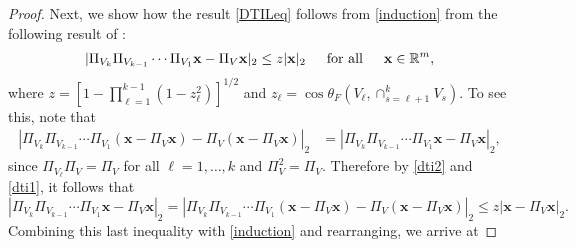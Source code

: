 \documentclass[journal, onecolumn]{IEEEtran}
\begin{document}
\begin{proof}

Next, we show how the result \eqref{DTILeq} follows from \eqref{induction} from the following result of \cite[Theorem 9.33]{Deutsch}:
\begin{align}\label{dti2}
|\Pi_{V_k}\Pi_{V_{k-1}}\cdots\Pi_{V_1} \mathbf{x} - \Pi_V\mathbf{x}|_2 \leq z |\mathbf{x}|_2 \indent \text{for all} \indent \mathbf{x} \in \mathbb{R}^m,
\end{align}
where $z= \left[1 - \prod_{\ell =1}^{k-1}(1-z_{\ell}^2)\right]^{1/2}$ and $z_{\ell} = \cos\theta_F\left(V_{\ell}, \cap_{s=\ell+1}^k V_s\right)$. To see this, note that
\begin{align}\label{dti1}
|\Pi_{V_k}\Pi_{V_{k-1}}\cdots\Pi_{V_1}(\mathbf{x} - \Pi_V\mathbf{x}) - \Pi_V(\mathbf{x} - \Pi_V\mathbf{x})|_2 
&= |\Pi_{V_k}\Pi_{V_{k-1}}\cdots\Pi_{V_1} \mathbf{x} - \Pi_V \mathbf{x} |_2,
\end{align}
since $\Pi_{V_\ell} \Pi_V = \Pi_V$ for all $\ell = 1, \ldots, k$ and $\Pi_V^2 = \Pi_V$.
Therefore by \eqref{dti2} and \eqref{dti1}, it follows that
\[|\Pi_{V_k}\Pi_{V_{k-1}}\cdots\Pi_{V_1} \mathbf{x} - \Pi_V \mathbf{x} |_2
= |\Pi_{V_k}\Pi_{V_{k-1}}\cdots\Pi_{V_1}(\mathbf{x} - \Pi_V\mathbf{x}) - \Pi_V(\mathbf{x} - \Pi_V\mathbf{x})|_2  \leq z |\mathbf{x} - \Pi_V\mathbf{x}|_2.\]
Combining this last inequality with \eqref{induction} and rearranging, we arrive at

\end{proof}
\end{document}
